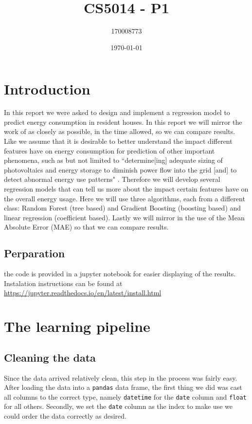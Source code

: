 \documentclass[british]{article}
\title{CS5014 - P1}
\author{170008773}
\date{\today}
\newcommand{\code}[1]{\texttt{#1}}
\begin{document}
	\maketitle
	
	
	
	
	\section{Introduction}
	\label{intro}
	In this report we were asked to design and implement a regression model to predict energy consumption in resident houses. In this report we will mirror the work of \autocite{Candanedo2017} as closely as possible, in the time allowed, so we can compare results. Like \citeauthor{Candanedo2017} we  assume that it is desirable to better understand the impact different features have on energy consumption for prediction of other important phenomena, such as but not limited to ``determine[ing] adequate sizing of photovoltaics and energy storage to diminish power flow into the grid [and] to detect abnormal energy use patterns" \autocite{Candanedo2017}. Therefore we will develop several regression models that can tell us more about the impact certain features have on the overall energy usage. Here we will use three algorithms, each from a different class: Random Forest (tree based) and Gradient Boosting (boosting based) and linear regression (coefficient based). Lastly we will mirror \citeauthor{Candanedo2017} in the use of the Mean Absolute Error (MAE) so that we can compare results. 
	
	\subsection{Perparation}
	the code is provided in a jupyter notebook for easier displaying of the results. Instalation instructions can be found at \url{https://jupyter.readthedocs.io/en/latest/install.html}
	
	\section{The learning pipeline}
	\label{content}
	
	\subsection{Cleaning the data}
	\label{cleaning}
	Since the data arrived relatively clean, this step in the process was fairly easy. After loading the data into a \code{pandas} data frame, the first thing we did was cast all columns to the correct type, namely \code{datetime} for the \code{date} column and \code{float} for all others. Secondly, we set the \code{date} column as the index to make use we could order the data correctly as desired. 
	
\end{document}
